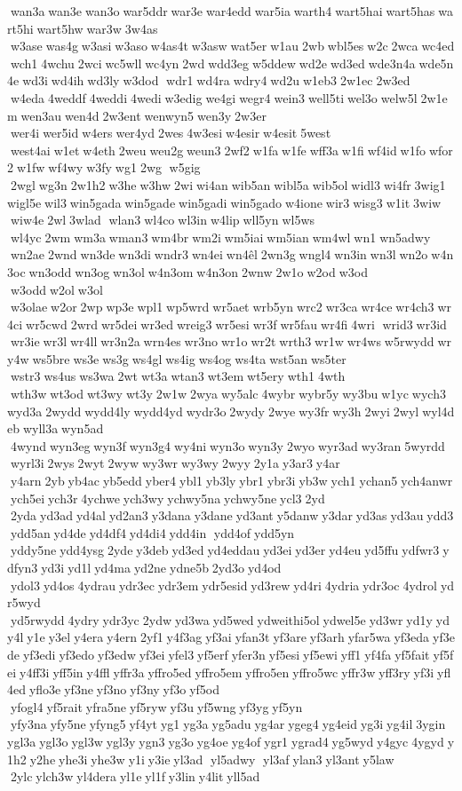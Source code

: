  wan3a wan3e wan3o war5ddr war3e war4edd war5ia warth4 wart5hai wart5has wart5hi wart5hw war3w 3w4as  w3ase was4g w3asi w3aso w4as4t w3asw wat5er w1au 2wb wbl5es w2c 2wca wc4ed wch1 4wchu 2wci wc5wll wc4yn 2wd wdd3eg w5ddew wd2e wd3ed wde3n4a wde5n4e wd3i wd4ih wd3ly w3dod  wdr1 wd4ra wdry4 wd2u w1eb3 2w1ec 2w3ed  w4eda 4weddf 4weddi 4wedi w3edig we4gi wegr4 wein3 well5ti wel3o welw5l 2w1em wen3au wen4d 2w3ent wenwyn5 wen3y 2w3er  wer4i wer5id w4ers wer4yd 2wes 4w3esi w4esir w4esit 5west  west4ai w1et w4eth 2weu weu2g weun3 2wf2 w1fa w1fe wff3a w1fi wf4id w1fo wfor2 w1fw wf4wy w3fy wg1 2wg  w5gig  2wgl wg3n 2w1h2 w3he w3hw 2wi wi4an wib5an wibl5a wib5ol widl3 wi4fr 3wig1 wigl5e wil3 win5gada win5gade win5gadi win5gado w4ione wir3 wisg3 w1it 3wiw  wiw4e 2wl 3wlad  wlan3 wl4co wl3in w4lip wll5yn wl5ws  wl4yc 2wm wm3a wman3 wm4br wm2i wm5iai wm5ian wm4wl wn1 wn5adwy  wn2ae 2wnd wn3de wn3di wndr3 wn4ei wn4êl 2wn3g wngl4 wn3in wn3l wn2o w4n3oc wn3odd wn3og wn3ol w4n3om w4n3on 2wnw 2w1o w2od w3od  w3odd w2ol w3ol  w3olae w2or 2wp wp3e wpl1 wp5wrd wr5aet wrb5yn wrc2 wr3ca wr4ce wr4ch3 wr4ci wr5cwd 2wrd wr5dei wr3ed wreig3 wr5esi wr3f wr5fau wr4fi 4wri  wrid3 wr3id  wr3ie wr3l wr4ll wr3n2a wrn4es wr3no wr1o wr2t wrth3 wr1w wr4ws w5rwydd wry4w ws5bre ws3e ws3g ws4gl ws4ig ws4og ws4ta wst5an ws5ter  wstr3 ws4us ws3wa 2wt wt3a wtan3 wt3em wt5ery wth1 4wth  wth3w wt3od wt3wy wt3y 2w1w 2wya wy5alc 4wybr wybr5y wy3bu w1yc wych3 wyd3a 2wydd wydd4ly wydd4yd wydr3o 2wydy 2wye wy3fr wy3h 2wyi 2wyl wyl4deb wyll3a wyn5ad  4wynd wyn3eg wyn3f wyn3g4 wy4ni wyn3o wyn3y 2wyo wyr3ad wy3ran 5wyrdd  wyrl3i 2wys 2wyt 2wyw wy3wr wy3wy 2wyy 2y1a y3ar3 y4ar  y4arn 2yb yb4ac yb5edd yber4 ybl1 yb3ly ybr1 ybr3i yb3w ych1 ychan5 ych4anwr ych5ei ych3r 4ychwe ych3wy ychwy5na ychwy5ne ycl3 2yd  2yda yd3ad yd4al yd2an3 y3dana y3dane yd3ant y5danw y3dar yd3as yd3au ydd3 ydd5an yd4de yd4df4 yd4di4 ydd4in  ydd4of ydd5yn  yddy5ne ydd4ysg 2yde y3deb yd3ed yd4eddau yd3ei yd3er yd4eu yd5ffu ydfwr3 ydfyn3 yd3i yd1l yd4ma yd2ne ydne5b 2yd3o yd4od  ydol3 yd4os 4ydrau ydr3ec ydr3em ydr5esid yd3rew yd4ri 4ydria ydr3oc 4ydrol ydr5wyd  yd5rwydd 4ydry ydr3yc 2ydw yd3wa yd5wed ydweithi5ol ydwel5e yd3wr yd1y ydy4l y1e y3el y4era y4ern 2yf1 y4f3ag yf3ai yfan3t yf3are yf3arh yfar5wa yf3eda yf3ede yf3edi yf3edo yf3edw yf3ei yfel3 yf5erf yfer3n yf5esi yf5ewi yff1 yf4fa yf5fait yf5fei y4ff3i yff5in y4ffl yffr3a yffro5ed yffro5em yffro5en yffro5wc yffr3w yff3ry yf3i yfl4ed yflo3e yf3ne yf3no yf3ny yf3o yf5od  yfogl4 yf5rait yfra5ne yf5ryw yf3u yf5wng yf3yg yf5yn  yfy3na yfy5ne yfyng5 yf4yt yg1 yg3a yg5adu yg4ar ygeg4 yg4eid yg3i yg4il 3ygin ygl3a ygl3o ygl3w ygl3y ygn3 yg3o yg4oe yg4of ygr1 ygrad4 yg5wyd y4gyc 4ygyd y1h2 y2he yhe3i yhe3w y1i y3ie yl3ad  yl5adwy  yl3af ylan3 yl3ant y5law  2ylc ylch3w yl4dera yl1e yl1f y3lin y4lit yll5ad 